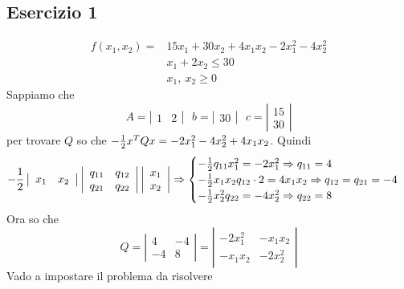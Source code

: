 \documentclass[12pt,a4paper]{article}
\begin{document}
\subsection{Esercizio 1}
\begin{equation*}
\begin{array}{rl}
f(x_1,x_2) = & 15x_1+30x_2+4x_1x_2 -2x_1^2-4x_2^2\\
& x_1+2x_2 \leq 30\\
& x_1,\ x_2 \geq 0
\end{array}
\end{equation*}
Sappiamo che $$A=\left|\begin{array}{cc} 1 & 2\end{array}\right| \ \ \ b=\left|\begin{array}{c} 30\end{array}\right| \ \ \ c=\left|\begin{array}{c} 15\\30\end{array}\right|$$
per trovare $Q$ so che $-{1\over2}x^TQx = -2x_1^2-4x_2^2+4x_1x_2$. Quindi $$-{1\over2}\left|\begin{array}{cc} x_1 & x_2\end{array}\right|\left|\begin{array}{cc} q_{11} & q_{12}\\q_{21} & q_{22}\end{array}\right|\left|\begin{array}{c} x_1\\ x_2\end{array}\right| \Rightarrow \begin{cases}-{1\over2}q_{11}x_1^2 = -2x_1^2 \Rightarrow q_{11}=4\\
-{1\over2}x_1x_2q_{12}\cdot 2 = 4x_1x_2 \Rightarrow q_{12}=q_{21}=-4\\
-{1\over2}x_2^2q_{22} = -4x_2^2 \Rightarrow q_{22} = 8\end{cases}$$
Ora so che $$Q=\left|\begin{array}{cc} 4 & -4\\ -4 & 8\end{array}\right| = \left|\begin{array}{cc} -2x_1^2 & -x_1x_2\\ -x_1x_2 & -2x_2^2\end{array}\right|$$
Vado a impostare il problema da risolvere
\end{document}
